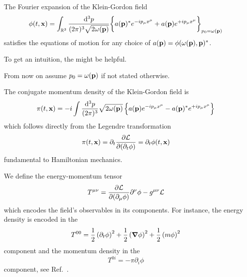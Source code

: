 \begin{theorem}\label{thm:kg_fourier_expansion}
	The Fourier expansion of the Klein-Gordon field
	\begin{equation}
		\phi(t,\vb{x})
		=
		\int_{\mathbb{R}^3}\frac{\dd[3]{p}}{(2\pi)^3\sqrt{2\omega(\vb{p})}}
		\biggl\{
			a(\vb{p})^*
			e^{-ip_\mu x^\mu}
			+
			a(\vb{p})
			e^{+ip_\mu x^\mu}
		\biggr\}_{p_0=\omega(\vb{p})}
	\end{equation}
	satisfies the equations of motion for any choice of $a(\vb{p})=\phi(\omega(\vb{p}),\vb{p})^*$.
\end{theorem}
To get an intuition, the  might be helpful.
\begin{remark}
	From now on assume $p_0=\omega(\vb{p})$ if not stated otherwise.
\end{remark}

\begin{corollary}
	The conjugate momentum density of the Klein-Gordon field is
	\begin{equation}
		\pi(t,\vb{x})
		=
		-i
		\int\frac{\dd[3]{p}}{(2\pi)^3}
		\sqrt{2\omega(\vb{p})}
		\left\{
			a(\vb{p})
			e^{-ip_\mu x^\mu}
			-
			a(\vb{p})^*
			e^{+ip_\mu x^\mu}
		\right\}
	\end{equation}
	which follows directly from the Legendre transformation
	\begin{equation}
		\pi(t,\vb{x})
		=
		\partial_t\pdv{\mathcal{L}}{(\partial_t\phi)}
		=
		\partial_t\phi(t,\vb{x})
	\end{equation}
	fundamental to Hamiltonian mechanics.
\end{corollary}

\begin{definition}
	We define the energy-momentum tensor
	\begin{equation}
		T^{\mu\nu}
		=
		\pdv{\mathcal{L}}{(\partial_\mu\phi)}\partial^\nu\phi
		-
		g^{\mu\nu}\mathcal{L}
		\label{eq:energy_momentum_tensor}
	\end{equation}
	which encodes the field's observables in its components.
	For instance, the energy density is encoded in the
	\begin{equation*}
		T^{00}
		=
		\frac{1}{2}
		\left(\partial_t\phi\right)^2
		+
		\frac{1}{2}
		\left(\grad\phi\right)^2
		+
		\frac{1}{2}
		\left(m\phi\right)^2		
	\end{equation*}
	component and the momentum density in the
	\begin{equation*}
		T^{0i}
		=
		-\pi\partial_i\phi		
	\end{equation*}
	component, see Ref.~\cite{Peskin1995}.
\end{definition}

